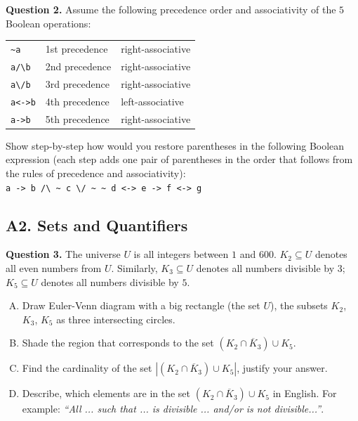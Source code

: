 \documentclass[jou]{apa6}
\begin{document}
\vspace{6pt}
{\bf Question 2.} 
Assume the following precedence order and associativity of the $5$ Boolean operations: 

\begin{tabular}{lll}
{\tt \textasciitilde{}a} & 1st precedence & right-associative \\
{\tt a/\textbackslash{}b} & 2nd precedence & right-associative \\
{\tt a\textbackslash{}/b} & 3rd precedence & right-associative \\
{\tt a<->b} & 4th precedence & left-associative \\
{\tt a->b} & 5th precedence & right-associative 
\end{tabular}

Show step-by-step how would you restore parentheses in the following 
Boolean expression (each step adds one pair of parentheses \textendash{}
in the order that follows from the rules of precedence 
and associativity):\\
{\tt a -> b /\textbackslash{} \textasciitilde{} c 
\textbackslash{}/ \textasciitilde{} \textasciitilde{} d 
<-> e -> f <-> g}





\subsection{A2. Sets and Quantifiers}

{\bf Question 3.} 
The universe $U$ is all integers between $1$ and $600$. 
$K_2 \subseteq U$ denotes all even numbers from $U$.
Similarly, $K_3 \subseteq U$ denotes all numbers divisible by $3$; 
$K_5 \subseteq U$ denotes all numbers divisible by $5$. 

\begin{enumerate}[(A)]
\item Draw Euler-Venn diagram with a big rectangle (the set $U$), 
the subsets $K_2$, $K_3$, $K_5$ as three intersecting circles.
\item Shade the region that corresponds to the set
$(K_2 \cap \overline K_3) \cup K_5$. 
\item Find the cardinality of the set
$\left| (K_2 \cap \overline K_3) \cup K_5 \right|$, 
justify your answer. 
\item Describe, which elements are in the set 
$(K_2 \cap \overline K_3) \cup K_5$ in English. 
For example: {\em ``All ... such that ... is divisible ... 
and/or is not divisible...''}. 
\end{enumerate}
\end{document}
